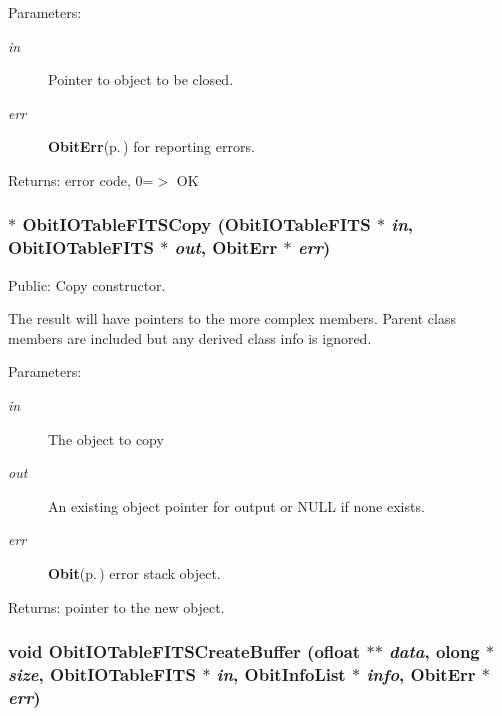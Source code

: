 \begin{Desc}
\item[Parameters:]
\begin{description}
\item[{\em in}]Pointer to object to be closed. \item[{\em err}]{\bf Obit\-Err}{\rm (p.\,\pageref{structObitErr})} for reporting errors. \end{description}
\end{Desc}
\begin{Desc}
\item[Returns:]error code, 0=$>$ OK \end{Desc}
\subsubsection{$\ast$ Obit\-IOTable\-FITSCopy ({\bf Obit\-IOTable\-FITS} $\ast$ {\em in}, {\bf Obit\-IOTable\-FITS} $\ast$ {\em out}, {\bf Obit\-Err} $\ast$ {\em err})}\label{ObitIOTableFITS_8c_a17}


Public: Copy constructor. 

The result will have pointers to the more complex members. Parent class members are included but any derived class info is ignored. \begin{Desc}
\item[Parameters:]
\begin{description}
\item[{\em in}]The object to copy \item[{\em out}]An existing object pointer for output or NULL if none exists. \item[{\em err}]{\bf Obit}{\rm (p.\,\pageref{structObit})} error stack object. \end{description}
\end{Desc}
\begin{Desc}
\item[Returns:]pointer to the new object. \end{Desc}
\subsubsection{\setlength{\rightskip}{0pt plus 5cm}void Obit\-IOTable\-FITSCreate\-Buffer ({\bf ofloat} $\ast$$\ast$ {\em data}, {\bf olong} $\ast$ {\em size}, {\bf Obit\-IOTable\-FITS} $\ast$ {\em in}, {\bf Obit\-Info\-List} $\ast$ {\em info}, {\bf Obit\-Err} $\ast$ {\em err})}\label{ObitIOTableFITS_8c_a30}


